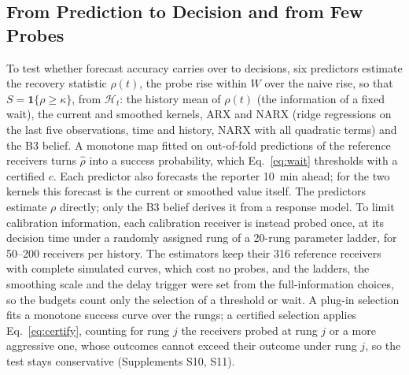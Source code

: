 \documentclass[conference]{IEEEtran}
\newcommand{\Hist}{\mathcal{H}}
\newcommand{\ind}{\mathbf{1}}
\begin{document}
\subsection{From Prediction to Decision and from Few Probes}
\label{sec:links}
To test whether forecast accuracy carries over to decisions, six predictors estimate the recovery statistic $\rho(t)$, the probe rise within $W$ over the naive rise, so that $S=\ind\{\rho\ge\kappa\}$, from $\Hist_t$: the history mean of $\rho(t)$ (the information of a fixed wait), the current and smoothed kernels, ARX and NARX (ridge regressions on the last five observations, time and history, NARX with all quadratic terms) and the B3 belief. A monotone map fitted on out-of-fold predictions of the reference receivers turns $\hat\rho$ into a success probability, which Eq.~\eqref{eq:wait} thresholds with a certified $c$. Each predictor also forecasts the reporter 10~min ahead; for the two kernels this forecast is the current or smoothed value itself. The predictors estimate $\rho$ directly; only the B3 belief derives it from a response model. To limit calibration information, each calibration receiver is instead probed once, at its decision time under a randomly assigned rung of a 20-rung parameter ladder, for 50--200 receivers per history. The estimators keep their 316 reference receivers with complete simulated curves, which cost no probes, and the ladders, the smoothing scale and the delay trigger were set from the full-information choices, so the budgets count only the selection of a threshold or wait. A plug-in selection fits a monotone success curve over the rungs; a certified selection applies Eq.~\eqref{eq:certify}, counting for rung $j$ the receivers probed at rung $j$ or a more aggressive one, whose outcomes cannot exceed their outcome under rung $j$, so the test stays conservative (Supplements S10, S11).
\end{document}
